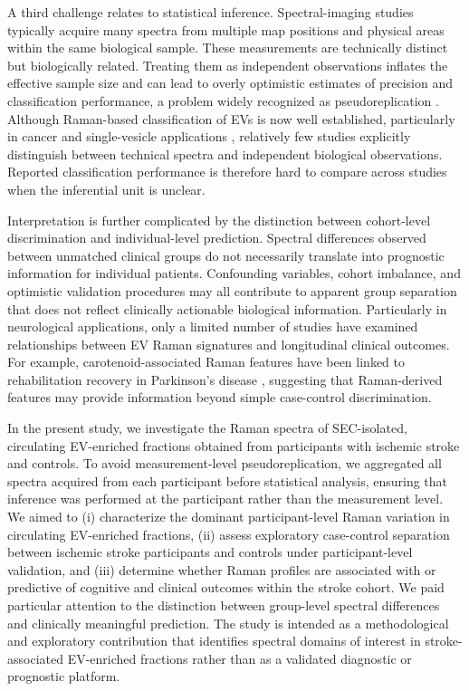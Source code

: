 \documentclass[preprint,12pt]{elsarticle}
\begin{document}
A third challenge relates to statistical inference. Spectral-imaging studies typically acquire many spectra from multiple map positions and physical areas within the same biological sample. These measurements are technically distinct but biologically related. Treating them as independent observations inflates the effective sample size and can lead to overly optimistic estimates of precision and classification performance, a problem widely recognized as pseudoreplication \cite{hurlbert1984, lazic2010, lazic2018}. Although Raman-based classification of EVs is now well established, particularly in cancer and single-vesicle applications \cite{lee2020,jensen2024}, relatively few studies explicitly distinguish between technical spectra and independent biological observations. Reported classification performance is therefore hard to compare across studies when the inferential unit is unclear.

Interpretation is further complicated by the distinction between cohort-level discrimination and individual-level prediction. Spectral differences observed between unmatched clinical groups do not necessarily translate into prognostic information for individual patients. Confounding variables, cohort imbalance, and optimistic validation procedures may all contribute to apparent group separation that does not reflect clinically actionable biological information. Particularly in neurological applications, only a limited number of studies have examined relationships between EV Raman signatures and longitudinal clinical outcomes. For example, carotenoid-associated Raman features have been linked to rehabilitation recovery in Parkinson's disease \cite{gualerzi2025}, suggesting that Raman-derived features may provide information beyond simple case-control discrimination.

In the present study, we investigate the Raman spectra of SEC-isolated, circulating EV-enriched fractions obtained from participants with ischemic stroke and controls. To avoid measurement-level pseudoreplication, we aggregated all spectra acquired from each participant before statistical analysis, ensuring that inference was performed at the participant rather than the measurement level. We aimed to (i) characterize the dominant participant-level Raman variation in circulating EV-enriched fractions, (ii) assess exploratory case-control separation between ischemic stroke participants and controls under participant-level validation, and (iii) determine whether Raman profiles are associated with or predictive of cognitive and clinical outcomes within the stroke cohort. We paid particular attention to the distinction between group-level spectral differences and clinically meaningful prediction. The study is intended as a methodological and exploratory contribution that identifies spectral domains of interest in stroke-associated EV-enriched fractions rather than as a validated diagnostic or prognostic platform.
\end{document}

